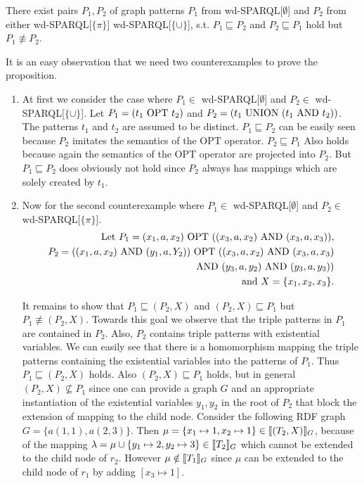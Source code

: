 \begin{proposition}
	There exist pairs $P_1,P_2$ of graph patterns $P_1$ from
	wd-SPARQL[$\emptyset$] and $P_2$ from either wd-SPARQL[$\{\pi\}$]
	wd-SPARQL[$\{\cup\}$], s.t. $P_1 \sqsubseteq P_2$ and $P_2 \sqsubseteq P_1$
	hold but $P_1 \not\equiv P_2$.
\end{proposition}
\begin{proofidea}
	It is an easy observation that we need two counterexamples to prove the
	proposition. 
	\begin{enumerate}	
		\item At first we consider the case where  $P_1 \in$
			wd-SPARQL[$\emptyset$] and  $P_2 \in$ wd-SPARQL[$\{\cup\}$]. Let
			$P_1 = (t_1 \mbox{ OPT } t_2)$ and $P_2 = (t_1 \mbox{ UNION } (t_1 \mbox{ AND } t_2))$. The patterns $t_1$ and $t_2$
			are assumed to be distinct.
			$P_1 \sqsubseteq P_2$ can be easily seen because $P_2$ imitates
			the semantics of the OPT operator. $P_2 \sqsubseteq P_1$ Also holds because again the
			semantics of the OPT operator are projected into $P_2$. But $P_1 \sqsubseteq P_2$ does
			obviously not hold since $P_2$ always has mappings which are solely created by
			$t_1$.
		\item 
			Now for the second counterexample where  $P_1 \in$
			wd-SPARQL[$\emptyset$] and  $P_2 \in$ wd-SPARQL[$\{\pi\}$]. 
			\begin{align*}
				\mbox{Let } P_1 = (x_1,a,x_2) \mbox{ OPT } ((x_3,a,x_2) \mbox{ AND } (x_3,a,x_3)),\\
			P_2 = ((x_1,a,x_2) \mbox{ AND } (y_1,a,Y_2)) \mbox{ OPT } ((x_3,a,x_2) \mbox{ AND }
			(x_3,a,x_3)\\ 
			\mbox{ AND } (y_3,a,y_2) \mbox{ AND } (y_3,a,y_3))\\
			\mbox{ and } X = \{x_1,x_2,x_3\}.
			\end{align*}
			
			It remains to show that $P_1 \sqsubseteq (P_2,X)$ and $(P_2,X)
			\sqsubseteq P_1$ but $P_1 \not\equiv (P_2,X)$.
		    Towards this goal we observe that the triple patterns in $P_1$ are
			contained in $P_2$. Also, $P_2$ contains triple patterns with
			existential variables. We can easily see that there is a
			homomorphism mapping the triple patterns containing the existential
			variables into the
			patterns of $P_1$. Thus $P_1 \sqsubseteq (P_2,X)$ holds. Also
			$(P_2,X) \sqsubseteq P_1$ holds, but in general $(P_2,X) \not\subseteq
			P_1$ since one can provide a graph $G$ and an appropriate
			instantiation of the existential variables $y_1, y_2$ in the root
			of $P_2$ that block the extension of mapping to the child node.
			Consider the following RDF graph $G = \{ a(1,1), a(2,3)\}$. Then
			$\mu = \{x_1 \mapsto 1, x_2 \mapsto 1\} \in \llbracket (T_2,X)\rrbracket_G$,
			because of the mapping $\lambda = \mu \cup \{ y_1 \mapsto 2,
			y_2\mapsto 3 \} \in \llbracket T_2 \rrbracket_G$ which cannot be extended to the
			child node of $r_2$. However $\mu \notin \llbracket T_1\rrbracket_G$ since $\mu$
			can be extended to the child node of $r_1$ by adding $[x_3 \mapsto
		1]$.
			
	\end{enumerate}
\end{proofidea}

